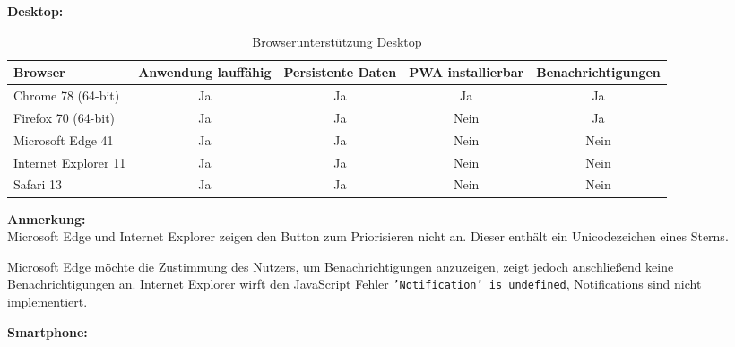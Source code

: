 \textbf{Desktop:}

\begin{table}[H]
	\centering
	\begin{tabularx}{\textwidth}{|l||C|C|C|C|}
		\hline
		Browser              & Anwendung lauffähig & Persistente Daten & PWA installierbar & Benachrichtigungen \\
		\hline
		Chrome 78 (64-bit)   & Ja                  & Ja                & Ja                & Ja                 \\
		Firefox 70 (64-bit)  & Ja                  & Ja                & Nein              & Ja                 \\
		Microsoft Edge 41    & Ja                  & Ja                & Nein              & Nein               \\
		Internet Explorer 11 & Ja                  & Ja                & Nein              & Nein               \\
		Safari 13            & Ja                  & Ja                & Nein              & Nein               \\
		\hline
	\end{tabularx}
	\caption{Browserunterstützung Desktop} \label{tab:browser_desktop}
\end{table}

\textbf{Anmerkung:}\\
Microsoft Edge und Internet Explorer zeigen den Button zum Priorisieren nicht an. Dieser enthält ein Unicodezeichen eines Sterns.

Microsoft Edge möchte die Zustimmung des Nutzers, um Benachrichtigungen anzuzeigen, zeigt jedoch anschließend keine Benachrichtigungen an. Internet Explorer wirft den JavaScript Fehler \texttt{'Notification' is undefined}, Notifications sind nicht implementiert.

\textbf{Smartphone:}

